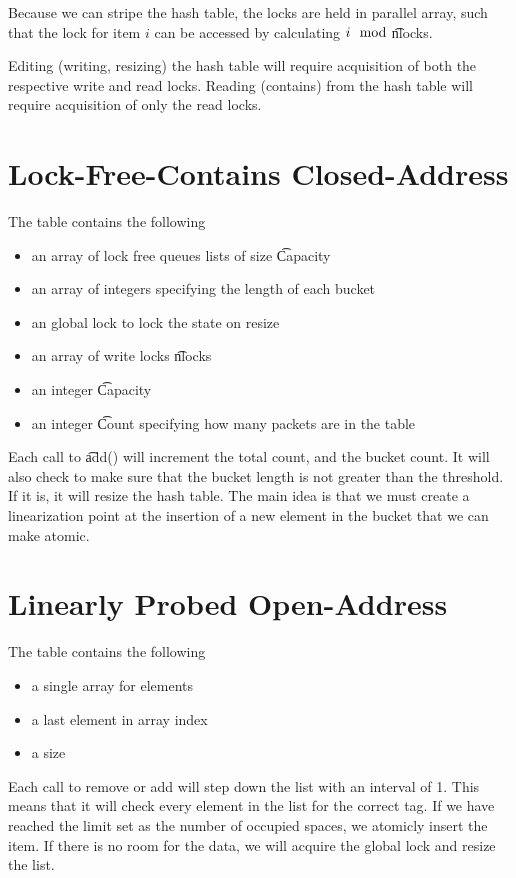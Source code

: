 Because we can stripe the hash table, the locks are held in parallel
array, such that the lock for item $i$ can be accessed by calculating
$i \mod$\t{nlocks}.

Editing (writing, resizing) the hash table will require acquisition of
both the respective write and read locks. Reading (contains) from the
hash table will require acquisition of only the read locks.

\section{Lock-Free-Contains Closed-Address}

The table contains the following
\begin{itemize}
\item an array of lock free queues lists of size \t{Capacity}
\item an array of integers specifying the length of each bucket
\item an global lock to lock the state on resize
\item an array of write locks \t{nlocks}
\item an integer \t{Capacity}
\item an integer \t{Count} specifying how many packets are in the table
\end{itemize}

Each call to \t{add()} will increment the total count, and the bucket
count.  It will also check to make sure that the bucket length is not
greater than the threshold.  If it is, it will resize the hash
table. The main idea is that we must create a linearization point at
the insertion of a new element in the bucket that we can make atomic.

\section{Linearly Probed Open-Address}

The table contains the following
\begin{itemize}
\item a single array for elements
\item a last element in array index
\item a size
\end{itemize}

Each call to remove or add will step down the list with an interval of
1.  This means that it will check every element in the list for the
correct tag. If we have reached the limit set as the number of
occupied spaces, we atomicly insert the item. If there is no room for
the data, we will acquire the global lock and resize the list.


